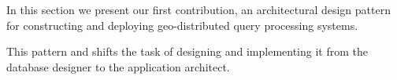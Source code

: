 





In this section we present our first contribution,
an architectural design pattern for constructing and deploying geo-distributed query processing systems.

This pattern
and shifts the task of designing and implementing it from the database designer to the application architect.

